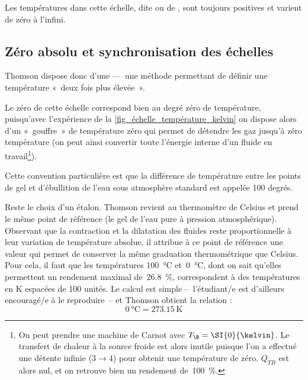 		Les températures dans cette échelle, dite  ou de , sont toujours positives et varient de zéro à l’infini.
		
		
	\subsection{Zéro absolu et synchronisation des échelles}
	
		Thomson dispose donc d’une  —\ une méthode permettant de définir une température «~deux fois plus élevée~».
		
		Le zéro de cette échelle correspond bien au degré zéro de température, puisqu’avec l’expérience de la \cref{fig_échelle_température_kelvin} on dispose alors d’un «~gouffre~» de température zéro qui permet de détendre les gaz jusqu’à zéro température (on peut ainsi convertir toute l’énergie interne d’un fluide en travail\footnote{On peut prendre une machine de Carnot avec $T_\B = \SI{0}{\kelvin}$. Le transfert de chaleur à la source froide est alors inutile puisque l’on a effectué une détente infinie ($3 \to 4$) pour obtenir une température de zéro. $Q_{TB}$ est alors nul, et on retrouve bien un rendement de~\SI{100}{\percent}.}).
		
			Cette convention particulière est que la différence de température entre les points de gel et d’ébullition de l’eau sous atmosphère standard est appelée 100 degrés.

		Reste le choix d’un étalon. Thomson revient au thermomètre de Celsius et prend le même point de référence (le gel de l’eau pure à pression atmosphérique). Observant que la contraction et la dilatation des fluides reste proportionnelle à leur variation de température absolue, il attribue à ce point de référence une valeur qui permet de conserver la même graduation thermométrique que Celsius. Pour cela, il faut que les températures \SI{100}{\celsius} et~\SI{0}{\celsius}, dont on sait qu’elles permettent un rendement maximal de~\SI{26,8}{\percent}, correspondent à des températures en \si{\kelvin} espacées de 100 unités. Le calcul est simple --\ l’étudiant/e est d’ailleurs encouragé/e à le reproduire\ -- et Thomson obtient la relation :
			\begin{equation}
			\SI{0}{\degreeCelsius} = \SI{273,15}{\kelvin}
			\label{eq_synchro_température}
			\end{equation}
		
